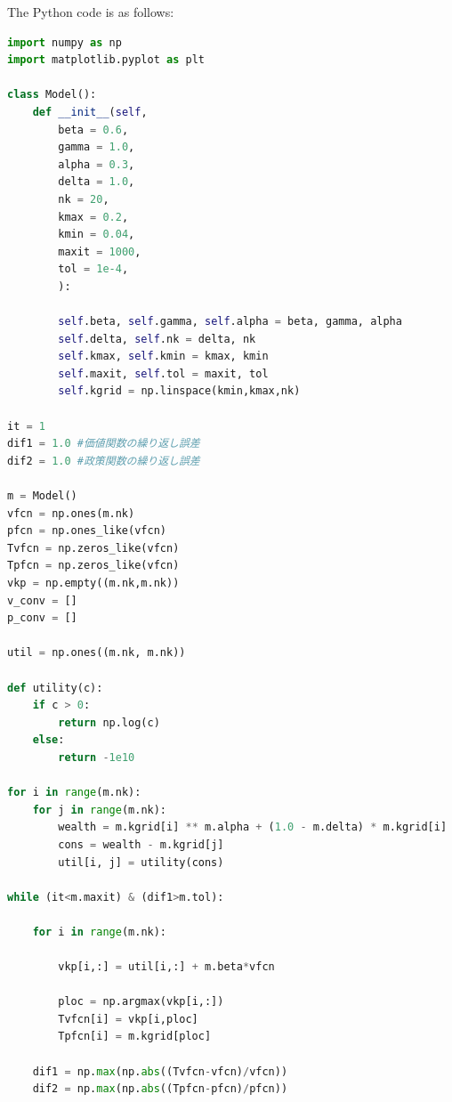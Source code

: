 \documentclass{ltjsarticle}
\begin{document}
The Python code is as follows:
\begin{lstlisting}[language=python,
    backgroundcolor=\color{backcolour},
    commentstyle=\color{codegreen},
    morekeywords={as},
    classoffset=0,
    keywordstyle=\color{codepurple},
    deletekeywords={list,in,float},
    classoffset=1,
    morekeywords={list},
    keywordstyle=\color{blue!60!green},
    classoffset=2,
    morekeywords={in},
    keywordstyle=\color{blue},
    classoffset=3,
    morekeywords={float},
    keywordstyle=\color{blue!40!green},
    numberstyle=\tiny\color{black},
    stringstyle=\color{codered},
    basicstyle=\ttfamily\footnotesize,
    breaklines=true,
    emph={len,range,print},
    emphstyle=\color{yellow!40!black}
    ]
import numpy as np
import matplotlib.pyplot as plt

class Model():
    def __init__(self,
        beta = 0.6,  
        gamma = 1.0,
        alpha = 0.3,  
        delta = 1.0,  
        nk = 20,   
        kmax = 0.2, 
        kmin = 0.04, 
        maxit = 1000,
        tol = 1e-4,  
        ): 
        
        self.beta, self.gamma, self.alpha = beta, gamma, alpha 
        self.delta, self.nk = delta, nk 
        self.kmax, self.kmin = kmax, kmin 
        self.maxit, self.tol = maxit, tol
        self.kgrid = np.linspace(kmin,kmax,nk) 

it = 1 
dif1 = 1.0 #価値関数の繰り返し誤差
dif2 = 1.0 #政策関数の繰り返し誤差

m = Model()
vfcn = np.ones(m.nk)
pfcn = np.ones_like(vfcn)
Tvfcn = np.zeros_like(vfcn)
Tpfcn = np.zeros_like(vfcn)
vkp = np.empty((m.nk,m.nk))
v_conv = [] 
p_conv = [] 

util = np.ones((m.nk, m.nk))

def utility(c):
    if c > 0:
        return np.log(c)
    else:
        return -1e10 

for i in range(m.nk):
    for j in range(m.nk): 
        wealth = m.kgrid[i] ** m.alpha + (1.0 - m.delta) * m.kgrid[i]
        cons = wealth - m.kgrid[j]
        util[i, j] = utility(cons) 

while (it<m.maxit) & (dif1>m.tol):

    for i in range(m.nk):
        
        vkp[i,:] = util[i,:] + m.beta*vfcn
        
        ploc = np.argmax(vkp[i,:])
        Tvfcn[i] = vkp[i,ploc]
        Tpfcn[i] = m.kgrid[ploc]
    
    dif1 = np.max(np.abs((Tvfcn-vfcn)/vfcn))
    dif2 = np.max(np.abs((Tpfcn-pfcn)/pfcn)) 
    

\end{lstlisting}
\end{document}
